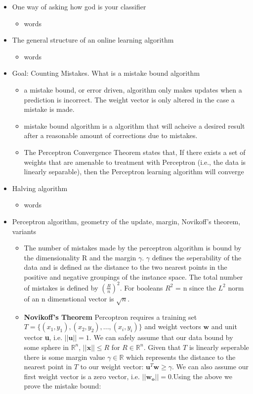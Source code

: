 \documentclass{article}
\begin{document}
\hspace{-1.5em}{\large \bf Mistake Bound Learning}
\begin{itemize}
\item One way of asking how god is your classifier
	\begin{itemize}
	\item words
	\end{itemize}
\item The general structure of an online learning algorithm
	\begin{itemize}
	\item words
	\end{itemize}
\item Goal: Counting Mistakes. What is a mistake bound algorithm
	\begin{itemize}
	\item a mistake bound, or error driven, algorithm only makes updates when a prediction is incorrect. The weight vector is only altered in the case a mistake is made. 
	\item mistake bound algorithm is a algorithm that will acheive a desired result after a reasonable amount of corrections due to mistakes. 
	\item The Perceptron Convergence Theorem states that, If there exists a set of weights that are amenable to treatment with Perceptron (i.e., the data is linearly separable), then the Perceptron learning algorithm will converge
	\end{itemize}
\item Halving algorithm
	\begin{itemize}
	\item words
	\end{itemize}
\item Perceptron algorithm, geometry of the update, margin, Novikoff's theorem, variants
	\begin{itemize}
	\item The number of mistakes made by the perceptron algorithm is bound by the dimensionality R and the margin $\gamma$. $\gamma$ defines the seperability of the data and is defined as the distance to the two nearest points in the positive and negative groupings of the instance space. The total number of mistakes is defined by $(\frac{R}{n})^2$. For booleans $R^2$ = n since the $L^2$ norm of an n dimenstional vector is $\sqrt{n}$.
	\item \textbf{Novikoff's Theorem} Percoptron requires a training set $T=\{ (x_1,y_1),(x_2,y_2),...,(x_i,y_i)\}$ and weight vectors $\mathbf{w}$ and unit vector \textbf{u}, i.e. $||\mathbf{u}|| = 1$. We can safely assume that our data bound by some sphere in $\mathbb{R}^n$, $||\mathbf{x}|| \leq R$ for $R\in \mathbb{R}^n$. Given that $T$ is linearly seperable there is some margin value $\gamma \in \mathbb{R}$ which represents the distance to the nearest point in $T$ to our weight vector: $\mathbf{u}^T\mathbf{w} \geq \gamma$. We can also assume our first weight vector is a zero vector, i.e. $||\mathbf{w_o}|| = 0. $Using the above we prove the mistake bound:\\

\end{itemize}
\end{itemize}
\end{document}

